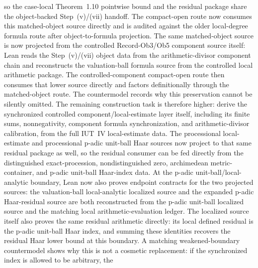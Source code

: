 \documentclass[11pt]{article}
\theoremstyle{plain}
\theoremstyle{definition}
\theoremstyle{remark}
\begin{document}
so the case-local Theorem~1.10 pointwise bound and the residual package share
the object-backed Step~(v)/(vii) handoff.
The compact-open route
\texttt{}
now consumes this matched-object source directly and is audited against the
older local-degree formula route after object-to-formula projection.
The same matched-object source is now projected from the controlled
Record-Ob3/Ob5 component source itself: Lean reads the Step~(v)/(vii) object
data from the arithmetic-divisor component chain and reconstructs the
valuation-ball formula source from the controlled local arithmetic package.
The controlled-component compact-open route then consumes that lower source
directly and factors definitionally through the matched-object route.
The
countermodel
\texttt{}
records why this preservation cannot be silently omitted.  The remaining
construction task is therefore higher: derive the synchronized controlled
component/local-estimate layer itself, including its finite sums, nonnegativity,
component formula synchronization, and arithmetic-divisor calibration, from the
full IUT~IV local-estimate data.  The
processional local-estimate and processional p-adic unit-ball Haar sources now
project to that same residual package as well, so the residual consumer can be
fed directly from the distinguished exact-procession, nondistinguished zero,
archimedean metric-container, and p-adic unit-ball Haar-index data.
At the p-adic unit-ball/local-analytic boundary, Lean now also proves endpoint
contracts for the two projected sources: the valuation-ball local-analytic
localized source and the expanded p-adic Haar-residual source are both
reconstructed from the p-adic unit-ball localized source and the matching local
arithmetic-evaluation ledger.  The localized source itself also proves the
same residual arithmetic directly: its local defined residual is the p-adic
unit-ball Haar index, and summing these identities recovers the residual Haar
lower bound at this boundary.
A matching weakened-boundary countermodel shows why this is not a cosmetic
replacement: if the synchronized index is allowed to be arbitrary, the
\end{document}
